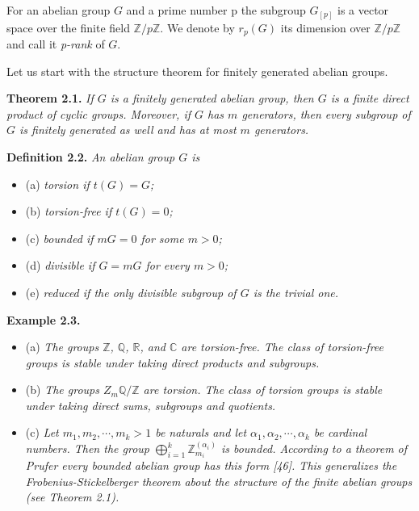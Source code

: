 \documentclass[12pt]{article}
\begin{document}
        For an abelian group $ G $ and a prime number p the subgroup $ G_[p] $ is a vector space over the finite field $ \mathbb{Z} /p \mathbb{Z} $.
    We denote by $r_{p} (G)$ its dimension over $ \mathbb{Z} /p \mathbb{Z} $ and call it \emph{p-rank} of $G$.
    
    
        Let us start with the structure theorem for finitely generated abelian groups.


    \textbf{Theorem 2.1.} \emph{If $ G $ is a finitely generated abelian group, then $ G $ is a finite direct product of cyclic groups.
    Moreover, if $ G $ has $ m $ generators, then every subgroup of $ G $ is finitely generated as well and has at most $ m $
    generators.}


    \textbf{Definition 2.2.} \emph{An abelian group $G$ is}

        \begin{itemize}

            \item (a) \emph{torsion if $t(G) = G$;}
        
            \item (b) \emph{torsion-free if $t(G) = 0$;}
        
            \item (c) \emph{bounded if $mG = 0$ for some $m > 0$;}
        
            \item (d) \emph{divisible if $G = mG$ for every $m > 0$;}
            
            \item (e) \emph{reduced if the only divisible subgroup of $G$ is the trivial one.}
        
        \end{itemize}


    \textbf{Example 2.3.}
    

        \begin{itemize}

            \item (a) \emph{The groups $ \mathbb{Z} $, $ \mathbb{Q} $, $ \mathbb{R} $, and $ \mathbb{C} $ are torsion-free. The class of torsion-free groups is stable
            under taking direct products and subgroups.}

            \item (b) \emph{The groups $Z_m \mathbb{Q} / \mathbb{Z}$ are torsion. The class of torsion groups is stable under taking direct sums, subgroups
            and quotients.}

            \item (c) \emph{ Let $m_1, m_2, \dotsb , m_k > 1$ be naturals and let $\alpha_1, \alpha_2, \dotsb , \alpha_k$ be cardinal numbers. Then the group $ \bigoplus^{k}_{i=1} \mathbb{Z}^{(\alpha_{i})}_{m_{i}} $
            is bounded. According to a theorem of Prufer every bounded abelian group has this form [46]. This generalizes the Frobenius-Stickelberger theorem about the structure of the finite abelian groups (see Theorem
            2.1).}

        \end{itemize}
\end{document}
